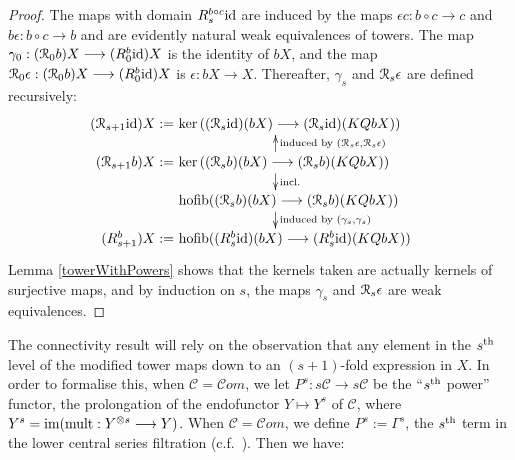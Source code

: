 \documentclass[11pt]{amsart}
\theoremstyle{plain}
\theoremstyle{definition}
\renewcommand{\ker}{\textup{ker}\,}
\DeclareMathOperator*{\hofib}{hofib}
\renewcommand{\to}{\longrightarrow}
\newcommand{\scrC}{\mathscr{C}}
\newcommand{\calR}{\mathcal{R}}
\newcommand{\calC}{\mathcal{C}}
\theoremstyle{plain}
\newcommand{\Id}{\textup{id}}
\newcommand{\algs}{{\scrC\!\textit{om}}}
\newcommand{\algcat}{{\calC}}%
\newcommand{\caldup}[1]{\calR_{\smash{#1}}}
\newcommand{\plainD}{R}
\newcommand{\barConstructionMightAbbreviate}{b}
\begin{document}
\begin{BK spec seq}
\begin{connectivity}
\begin{proof}
The maps with domain $\plainD_{\smash{s}}^{\smash{\barConstructionMightAbbreviate \circ c}}\Id $ are induced by the maps $\epsilon c:\barConstructionMightAbbreviate \circ c\to c$ and $\barConstructionMightAbbreviate \epsilon:\barConstructionMightAbbreviate \circ c\to \barConstructionMightAbbreviate $ and are evidently natural weak equivalences of towers. The map $\gamma_0:(\caldup{0}\barConstructionMightAbbreviate )X\to (\plainD_{\smash{0}}^{\smash{\barConstructionMightAbbreviate }}\Id )X$ is the identity of $\barConstructionMightAbbreviate X$, and the map $\caldup{0}\epsilon:(\caldup{0}\barConstructionMightAbbreviate )X\to (\plainD_{\smash{0}}^{\smash{\barConstructionMightAbbreviate }}\Id )X$ is $\epsilon:\barConstructionMightAbbreviate X\to X$. Thereafter, $\gamma_s$ and $\caldup{s}\epsilon$ are defined recursively:
\[\qquad \quad \xymatrix@R=4mm{
\makebox[0cm][r]{$(\caldup{s+1}\Id )X:=\,$}\makebox[5cm][l]{$\,\ker((\caldup{s}\Id )(\barConstructionMightAbbreviate X)\to (\caldup{s}\Id )(KQ\barConstructionMightAbbreviate X))$}\\
\makebox[0cm][r]{$(\caldup{s+1}\barConstructionMightAbbreviate )X:=\,$}\makebox[5cm][l]{$\,\ker((\caldup{s}\barConstructionMightAbbreviate )(\barConstructionMightAbbreviate X)\to (\caldup{s}\barConstructionMightAbbreviate )(KQ\barConstructionMightAbbreviate X))$}\ar[d]^-{\textup{incl.}}_-{}%
\ar[u]_-{\textup{induced by }(\caldup{s}\epsilon,\caldup{s}\epsilon)}^-{}%
\\%
\makebox[5cm][l]{$\,\hofib((\caldup{s}\barConstructionMightAbbreviate )(\barConstructionMightAbbreviate X)\to(\caldup{s}\barConstructionMightAbbreviate )(KQ\barConstructionMightAbbreviate X))$}\ar[d]^-{\textup{induced by }(\gamma_{s},\gamma_{s})}_-{}%
\\%
\makebox[0cm][r]{$(\plainD_{\smash{s+1}}^{\smash{\barConstructionMightAbbreviate }})X:=\,$}\makebox[5cm][l]{$\,\hofib((\plainD_{\smash{s}}^{\smash{\barConstructionMightAbbreviate }}\Id )(\barConstructionMightAbbreviate X)\to (\plainD_{\smash{s}}^{\smash{\barConstructionMightAbbreviate }}\Id )(KQ\barConstructionMightAbbreviate X))$}%
}\]
\noindent Lemma \ref{towerWithPowers} shows that the kernels taken are actually kernels of surjective maps, and by induction on $s$, the maps $\gamma_s$ and $\caldup{s}\epsilon$ are weak equivalences.
\end{proof}
The connectivity result will rely on the observation that any element in the $s^\textup{th}$ level of the modified tower maps down to an $(s+1)$-fold expression in $X$. In order to formalise this, when $\algcat=\algs$, we let $P^s:s\algcat\to s\algcat$ be the ``$s^\textup{th}$ power'' functor, the prolongation of the endofunctor $Y\mapsto Y^s$ of $\algcat$, where $Y^s=\textup{im}(\textup{mult}:Y^{\otimes s}\to Y)$. When $\algcat=\algs$, we define $P^s:=\Gamma^s$, the $s^\textup{th}$ term in the lower central series filtration (c.f.\ \cite{6Author.pdf}). Then we have:

\end{connectivity}
\end{BK spec seq}
\end{document}
